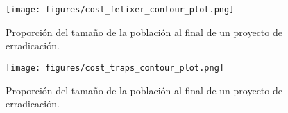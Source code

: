 \documentclass{article} %
\begin{document}
\begin{figure}[H]
\centering
\texttt{[image: figures/cost\_felixer\_contour\_plot.png]}
\caption{Proporción del tamaño de la población al final de un proyecto de erradicación.}
\label{fig:culling_contour_plot}
\end{figure}

\begin{figure}[H]
\centering
\texttt{[image: figures/cost\_traps\_contour\_plot.png]}
\caption{Proporción del tamaño de la población al final de un proyecto de erradicación.}
\label{fig:culling_contour_plot}
\end{figure}



\end{document}
